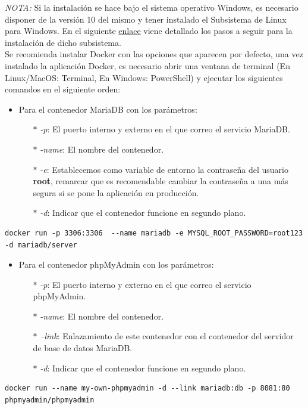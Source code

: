 \documentclass[../../main.tex]{subfiles}
\begin{document}
\textit{NOTA: } Si la instalación se hace bajo el sistema operativo Windows, es necesario disponer de la versión 10 del mismo y tener instalado el Subsistema de Linux para Windows.
En el siguiente \href{https://docs.microsoft.com/en-us/windows/wsl/install-win10}{enlace} viene detallado los pasos a seguir para la instalación de dicho subsistema.\\

Se recomienda instalar Docker con las opciones que aparecen por defecto, una vez instalado la aplicación Docker, es necesario abrir una ventana de terminal (En Linux/MacOS: Terminal, En Windows: PowerShell) y ejecutar los siguientes comandos en el siguiente orden:

\begin{itemize}
\item Para el contenedor MariaDB con los  parámetros:
\begin{itemize}
\item[$\ast$] \textit{-p}: El puerto interno y externo en el que correo el servicio MariaDB.
\item[$\ast$]\textit{-name}: El nombre del contenedor.
\item[$\ast$] \textit{-e}: Establecemos como variable de entorno la contraseña del usuario \textbf{root}, remarcar que es recomendable cambiar la contraseña a una más segura si se pone la aplicación en producción.
\item[$\ast$] \textit{-d}: Indicar que el contenedor funcione en segundo plano.
\end{itemize}
\end{itemize}
\begin{lstlisting}
docker run -p 3306:3306  --name mariadb -e MYSQL_ROOT_PASSWORD=root123 -d mariadb/server
\end{lstlisting}

\vskip 0.2in

\begin{itemize}
\item Para el contenedor phpMyAdmin con los parámetros:
\begin{itemize}
\item[$\ast$] \textit{-p}: El puerto interno y externo en el que correo el servicio phpMyAdmin.
\item[$\ast$]\textit{-name}: El nombre del contenedor.
\item[$\ast$] \textit{--link}: Enlazamiento de este contenedor con el contenedor del servidor de base de datos MariaDB.
\item[$\ast$] \textit{-d}: Indicar que el contenedor funcione en segundo plano.
\end{itemize}
\end{itemize}
\begin{lstlisting}
docker run --name my-own-phpmyadmin -d --link mariadb:db -p 8081:80 phpmyadmin/phpmyadmin
\end{lstlisting}
\end{document}
